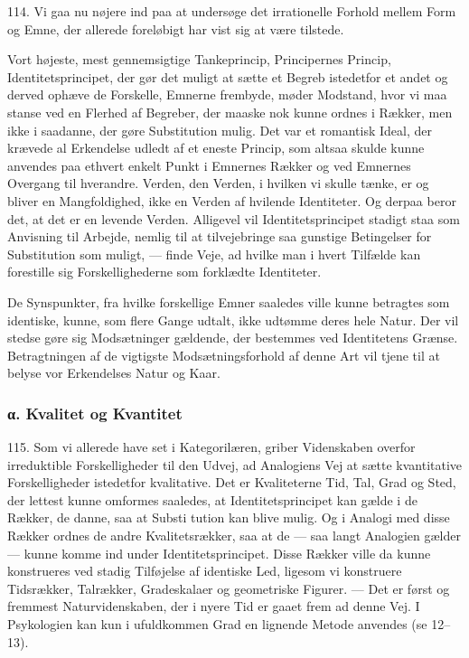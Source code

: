 \documentclass[12pt,a4paper]{book}
\newcommand{\opage}[1]{\marginnote{\footnotesize\textit{[#1]}}}
\begin{document}
114. Vi gaa nu nøjere ind paa at undersøge det irrationelle Forhold mellem Form og
Emne, der allerede foreløbigt har vist sig at være tilstede.

Vort højeste, mest gennemsigtige Tankeprincip, Principernes Princip,
Identitetsprincipet, der gør det muligt at sætte et Begreb istedetfor et andet og
derved ophæve de Forskelle, Emnerne frembyde, møder Modstand, hvor vi maa stanse ved
en Flerhed af Begreber, der maaske nok kunne ordnes i Rækker, men ikke i saadanne,
der gøre Substitution mulig. Det var et romantisk Ideal, der krævede al Erkendelse
udledt af et eneste Princip, som altsaa skulde kunne anvendes paa ethvert enkelt
Punkt i Emnernes Rækker og ved Emnernes Overgang til hverandre. Verden, den Verden,
i hvilken vi skulle tænke, er og bliver en Mangfoldighed, ikke en Verden af hvilende
Identiteter. Og derpaa beror det, at det er en levende Verden. Alligevel vil
Identitetsprincipet stadigt staa som Anvisning til Arbejde, nemlig til at
tilvejebringe saa gunstige Betingelser for Substitution som muligt, --- finde Veje,
ad hvilke man i hvert Tilfælde kan forestille sig Forskellighederne som forklædte
Identiteter.

De Synspunkter, fra hvilke forskellige Emner saaledes ville kunne betragtes som
identiske, kunne, som flere Gange udtalt, ikke udtømme deres hele Natur. Der vil
stedse gøre sig Modsætninger gældende, der bestemmes ved Identitetens Grænse.
Betragtningen af de vigtigste Modsætningsforhold af denne Art vil tjene til at
belyse vor Erkendelses Natur og Kaar.

\subsubsection*{α. Kvalitet og Kvantitet}

115. Som vi allerede have set i Kategorilæren, griber Videnskaben overfor
irreduktible Forskelligheder til den Udvej, ad Analogiens Vej at sætte kvantitative
Forskelligheder istedetfor kvalitative. Det er Kvaliteterne Tid, Tal, Grad og Sted,
der lettest kunne omformes saaledes, at Identitetsprincipet kan gælde i de Rækker,
de danne, saa at Substi%
\opage{275}tution kan blive mulig. Og i Analogi med disse Rækker ordnes
de andre Kvalitetsrækker, saa at de --- saa langt Analogien gælder --- kunne komme
ind under Identitetsprincipet. Disse Rækker ville da kunne konstrueres ved stadig
Tilføjelse af identiske Led, ligesom vi konstruere Tidsrækker, Talrækker,
Gradeskalaer og geometriske Figurer. --- Det er først og fremmest Naturvidenskaben,
der i nyere Tid er gaaet frem ad denne Vej. I Psykologien kan kun i ufuldkommen Grad
en lignende Metode anvendes (se 12--13).
\end{document}
